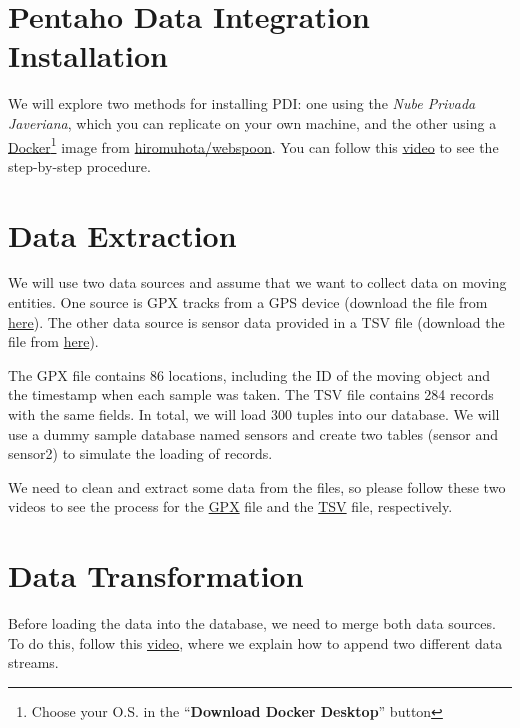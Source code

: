 \documentclass{article}
\begin{document}
\section{Pentaho Data Integration Installation}
We will explore two methods for installing PDI: one using the \textit{Nube Privada Javeriana}, which you can replicate on your own machine, and the other using a \href{https://www.docker.com/products/docker-desktop/}{Docker}\footnote{Choose your O.S. in the ``\textbf{Download Docker Desktop}'' button} image from \href{https://hub.docker.com/r/hiromuhota/webspoon/}{hiromuhota/webspoon}. You can follow this \href{https://drive.google.com/file/d/10TFCXvl7-7Xs-pISO8_RyQS0WkicoHhC/view?usp=drive_link}{video} to see the step-by-step procedure.

\section{Data Extraction}
We will use two data sources and assume that we want to collect data on moving entities. One source is GPX tracks from a GPS device (download the file from \href{https://drive.google.com/file/d/1eyb5l5RjimtkEdgKsqet2AVUfHqBydWK/view?usp=drive_link}{here}). The other data source is sensor data provided in a TSV file (download the file from \href{https://drive.google.com/file/d/13r72OnZu4TZc1HqLNFjZMOkkXk5kWRDt/view?usp=drive_link}{here}).

The GPX file contains 86 locations, including the ID of the moving object and the timestamp when each sample was taken. The TSV file contains 284 records with the same fields. In total, we will load 300 tuples into our database. We will use a dummy sample database named sensors and create two tables (sensor and sensor2) to simulate the loading of records.

We need to clean and extract some data from the files, so please follow these two videos to see the process for the \href{https://drive.google.com/file/d/1-3AYopykAj_XVb12UHlbSCvJ0ozEx8tO/view?usp=sharing}{GPX} file and the \href{https://drive.google.com/file/d/1fNWGFPNufY0PBSzRQeEaHNfhFgpkC29a/view?usp=drive_link}{TSV} file, respectively.

\section{Data Transformation}
Before loading the data into the database, we need to merge both data sources. To do this, follow this \href{https://drive.google.com/file/d/1Vxy3xEdjDLd5ZCSYHBnQO-yoWGkRpUQD/view?usp=drive_link}{video}, where we explain how to append two different data streams.
\end{document}
